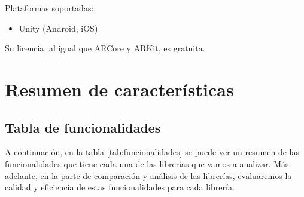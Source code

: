Plataformas soportadas:
\begin{itemize}
\item Unity (Android, iOS)
\end{itemize}

Su licencia, al igual que ARCore y ARKit, es gratuita.
\section{Resumen de características}
\subsection{Tabla de funcionalidades}
A continuación, en la tabla \ref{tab:funcionalidades} se puede ver un resumen de  las funcionalidades que tiene cada una de las librerías que vamos a analizar. Más adelante, en la parte de comparación y análisis de las librerías, evaluaremos la calidad y eficiencia de estas funcionalidades para cada librería.

